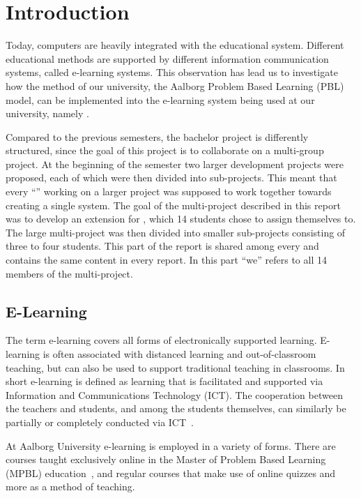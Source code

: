 \chapter{Introduction}
Today, computers are heavily integrated with the educational system.
Different educational methods are supported by different information communication systems, called e-learning systems.
This observation has lead us to investigate how the method of our university, the Aalborg Problem Based Learning (PBL) model, can be implemented into the e-learning system being used at our university, namely \moodle{}.

Compared to the previous semesters, the bachelor project is differently structured, since the goal of this project is to collaborate on a multi-group project. At the beginning of the semester two larger development projects were proposed, each of which were then divided into sub-projects. This meant that every ``\subgroup{}'' working on a larger project was supposed to work together towards creating a single system. The goal of the multi-project described in this report was to develop an extension for \moodle{}, which 14 students chose to assign themselves to. The large multi-project was then divided into smaller sub-projects consisting of three to four students.
This part of the report is shared among every \subgroup{} and contains the same content in every report.
In this part ``we'' refers to all 14 members of the multi-project.

\section{E-Learning}
\label{sec:e-learning}
The term e-learning covers all forms of electronically supported learning. 
E-learning is often associated with distanced learning and out-of-classroom teaching, but can also be used to support traditional teaching in classrooms. 
In short e-learning is defined as learning that is facilitated and supported via Information and Communications Technology (ICT). 
The cooperation between the teachers and students, and among the students themselves, can similarly be partially or completely conducted via ICT~\cite{def-e-learning1}\cite{def-e-learning2}.

At Aalborg University e-learning is employed in a variety of forms. 
There are courses taught exclusively online in the Master of Problem Based Learning (MPBL) education~\cite{mpbl}, and regular courses that make use of online quizzes and more as a method of teaching.

